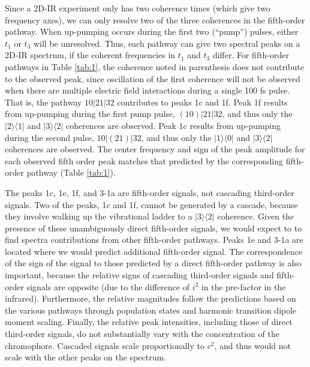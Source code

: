 {Since a 2D-IR experiment only has two coherence times (which give two frequency axes), we can only resolve two of the three coherences in the fifth-order pathway. When up-pumping occurs during the first two (``pump'') pulses, either \(t_1\) or $t_3$ will be unresolved. Thus, each pathway can give two spectral peaks on a 2D-IR spectrum, if the coherent frequencies in \(t_1\) and $t_3$ differ.  For fifth-order pathways in Table \ref{tab:1}, the coherence noted in parenthesis does not contribute to the observed peak, since oscillation of the first coherence will not be observed when there are multiple electric field interactions during a single 100 fs pulse. That is, the pathway $10|21|32$ contributes to peaks 1c and 1f. Peak 1f results from up-pumping during the first pump pulse, $\left(10\right)|21|32$, and thus only the $|2\rangle\langle1|$ and $|3\rangle\langle2|$ coherences are observed. Peak 1c results from up-pumping during the second pulse, $10|\left(21\right)|32$, and thus only the $|1\rangle\langle0|$ and $|3\rangle\langle2|$ coherences are observed. The center frequency and sign of the peak amplitude for each observed fifth order peak matches that predicted by the corresponding fifth-order pathway (Table \ref{tab:1}).

The peaks 1c, 1e, 1f, and 3-1a are fifth-order signals, not cascading third-order signals. Two of the peaks, 1c and 1f, cannot be generated by a cascade, because they involve walking up the vibrational ladder to a $|3\rangle\langle2|$ coherence. Given the presence of these unambiguously direct fifth-order signals, we would expect to to find spectra contributions from other fifth-order pathways. Peaks 1e and 3-1a are located where we would predict additional fifth-order signal. The correspondence of the sign of the signal to those predicted by a direct fifth-order pathway is also important, because the relative signs of cascading third-order signals and fifth-order signals are opposite (due to the difference of $i^2$ in the pre-factor in the infrared). Furthermore, the relative magnitudes follow the predictions based on the various pathways through population states and harmonic transition dipole moment scaling.\cite{Garrett-Roe2009b} Finally, the relative peak intensities, including those of direct third-order signals, do not substantially vary with the concentration of the chromophore. Cascaded signals scale proportionally to $c^2$, and thus would not scale with the other peaks on the spectrum.

}

